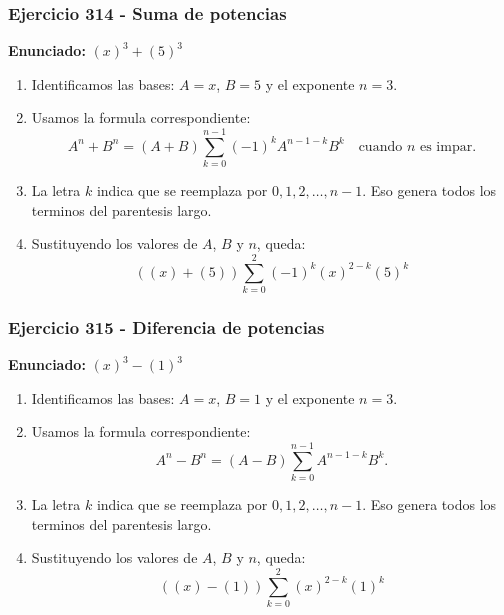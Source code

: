 \documentclass[11pt,a4paper]{article}
\begin{document}
\subsubsection*{Ejercicio 314 - Suma de potencias}
\textbf{Enunciado:} $ \left(x\right)^{3}+\left(5\right)^{3} $\par
\begin{enumerate}[leftmargin=2em]
\item Identificamos las bases: \(A=x\), \(B=5\) y el exponente \(n=3\).
\item Usamos la formula correspondiente: \[A^n+B^n=(A+B)\sum_{k=0}^{n-1}(-1)^kA^{n-1-k}B^k\quad\text{cuando }n\text{ es impar}.\]
\item La letra \(k\) indica que se reemplaza por \(0,1,2,\ldots,n-1\). Eso genera todos los terminos del parentesis largo.
\item Sustituyendo los valores de \(A\), \(B\) y \(n\), queda: \[\boxed{\left(\left(x\right)+\left(5\right)\right)\sum_{k=0}^{2}(-1)^k\left(x\right)^{2-k}\left(5\right)^k}\]
\end{enumerate}

\vspace{0.2cm}
\subsubsection*{Ejercicio 315 - Diferencia de potencias}
\textbf{Enunciado:} $ \left(x\right)^{3}-\left(1\right)^{3} $\par
\begin{enumerate}[leftmargin=2em]
\item Identificamos las bases: \(A=x\), \(B=1\) y el exponente \(n=3\).
\item Usamos la formula correspondiente: \[A^n-B^n=(A-B)\sum_{k=0}^{n-1}A^{n-1-k}B^k.\]
\item La letra \(k\) indica que se reemplaza por \(0,1,2,\ldots,n-1\). Eso genera todos los terminos del parentesis largo.
\item Sustituyendo los valores de \(A\), \(B\) y \(n\), queda: \[\boxed{\left(\left(x\right)-\left(1\right)\right)\sum_{k=0}^{2}\left(x\right)^{2-k}\left(1\right)^k}\]
\end{enumerate}

\vspace{0.2cm}
\end{document}
